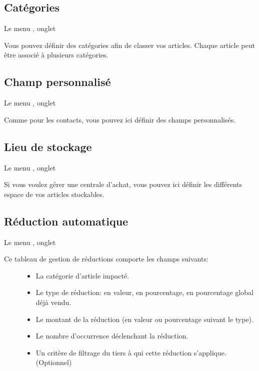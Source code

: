 \documentclass[a4paper,10pt,oneside,french]{sphinxmanual}
\begin{document}
\subsection{Catégories}
\label{\detokenize{invoice/configuration:categories}}
Le menu , onglet 

Vous pouvez définir des catégories afin de classer vos articles.
Chaque article peut être associé à plusieurs catégories.


\subsection{Champ personnalisé}
\label{\detokenize{invoice/configuration:champ-personnalise}}
Le menu , onglet 

Comme pour les contacts, vous pouvez ici définir des champs personnalisés.


\subsection{Lieu de stockage}
\label{\detokenize{invoice/configuration:lieu-de-stockage}}
Le menu , onglet 

Si vous voulez gérer une centrale d’achat, vous pouvez ici définir les différents espace de vos articles stockables.


\subsection{Réduction automatique}
\label{\detokenize{invoice/configuration:reduction-automatique}}
Le menu , onglet 
\begin{description}
\item[{Ce tableau de gestion de réductions comporte les champs suivants:}] \leavevmode\begin{itemize}
\item {} 
La catégorie d’article impacté.

\item {} 
Le type de réduction: en valeur, en pourcentage, en pourcentage global déjà vendu.

\item {} 
Le montant de la réduction (en valeur ou pourcentage suivant le type).

\item {} 
Le nombre d’occurrence déclenchant la réduction.

\item {} 
Un critère de filtrage du tiers à qui cette réduction s’applique. (Optionnel)

\end{itemize}

\end{description}
\end{document}
